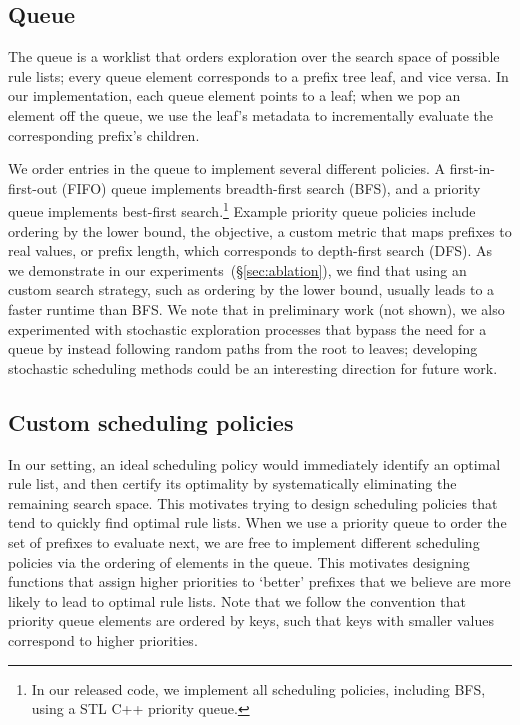 \subsection{Queue}
\label{sec:queue}

The queue is a worklist that orders exploration over the search space of possible
rule lists; every queue element corresponds to a prefix tree leaf, and vice versa.
%
In our implementation, each queue element points to a leaf;
when we pop an element off the queue, we use the leaf's metadata to
incrementally evaluate the corresponding prefix's children.

We order entries in the queue to implement several different policies.
%
A first-in-first-out (FIFO) queue implements breadth-first search (BFS),
and a priority queue implements best-first search.\footnote{In our released code,
we implement all scheduling policies, including BFS, using a STL C++ priority queue.}
%
Example priority queue policies include ordering
by the lower bound, the objective, a custom metric that maps prefixes to real values,
or prefix length, which corresponds to depth-first search (DFS).
%
As we demonstrate in our experiments~(\S\ref{sec:ablation}),
we find that using an custom search strategy,
such as ordering by the lower bound, usually leads to a faster runtime than BFS.
%
We note that in preliminary work (not shown), we also experimented with
stochastic exploration processes that bypass the need for a queue
by instead following random paths from the root to leaves;
developing stochastic scheduling methods could be an interesting direction for future work.

\subsection{Custom scheduling policies}
\label{sec:scheduling}

In our setting, an ideal scheduling policy would immediately identify an optimal
rule list, and then certify its optimality by systematically eliminating the
remaining search space.
%
This motivates trying to design scheduling policies that tend to quickly find optimal rule lists.
%
When we use a priority queue to order the set of prefixes to evaluate next,
we are free to implement different scheduling policies via the ordering of
elements in the queue.
%
This motivates designing functions that assign higher priorities to `better'
prefixes that we believe are more likely to lead to optimal rule lists.
%
Note that we follow the convention that priority queue elements are ordered
by keys, such that keys with smaller values correspond to higher priorities.

